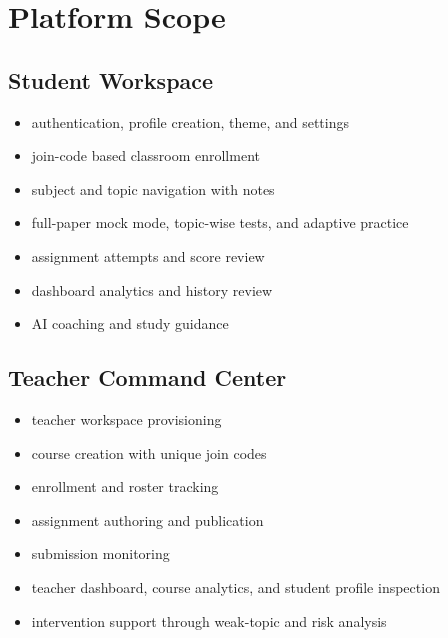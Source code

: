\documentclass[10pt,twocolumn,a4paper]{article}
\begin{document}
\section{Platform Scope}
\subsection{Student Workspace}
\begin{itemize}
  \item authentication, profile creation, theme, and settings
  \item join-code based classroom enrollment
  \item subject and topic navigation with notes
  \item full-paper mock mode, topic-wise tests, and adaptive practice
  \item assignment attempts and score review
  \item dashboard analytics and history review
  \item AI coaching and study guidance
\end{itemize}

\subsection{Teacher Command Center}
\begin{itemize}
  \item teacher workspace provisioning
  \item course creation with unique join codes
  \item enrollment and roster tracking
  \item assignment authoring and publication
  \item submission monitoring
  \item teacher dashboard, course analytics, and student profile inspection
  \item intervention support through weak-topic and risk analysis
\end{itemize}
\end{document}
